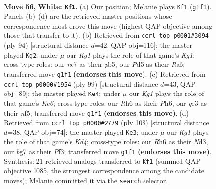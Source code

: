 \documentclass[11pt]{article}
\begin{document}
\clearpage

\begin{figure}[p]\centering
\begin{subfigure}{0.46\textwidth}\centering
\resizebox{\linewidth}{!}{%
\newchessgame
\chessboard[
  setfen={6k1/2n2pb1/7R/3P4/8/4q3/6R1/6K1 w - - 1 56},
  showmover=false,
  pgfstyle=straightmove, color=movearrow, markmove={g1-f1}
]}
\caption{}
\end{subfigure}\hfill
\begin{subfigure}{0.46\textwidth}\centering
\resizebox{\linewidth}{!}{%
\newchessgame
\chessboard[
  setfen={8/3R1pk1/R3P1p1/1p6/8/4q3/8/6K1 w - - 2 48},
  showmover=false,
  pgfstyle=straightmove, color=movearrow, markmove={g1-g2}
]}
\caption{}
\end{subfigure}
\\[4pt]
\begin{subfigure}{0.46\textwidth}\centering
\resizebox{\linewidth}{!}{%
\newchessgame
\chessboard[
  setfen={8/8/7p/5N2/5p2/4k3/6PP/r3BK2 b - - 4 50},
  showmover=false,
  pgfstyle=straightmove, color=movearrow, markmove={e3-e4}
]}
\caption{}
\end{subfigure}\hfill
\begin{subfigure}{0.46\textwidth}\centering
\resizebox{\linewidth}{!}{%
\newchessgame
\chessboard[
  setfen={8/8/5qpk/p2R4/3K4/1P1N1P1B/8/8 w - - 1 55},
  showmover=false,
  pgfstyle=straightmove, color=movearrow, markmove={d4-e3}
]}
\caption{}
\end{subfigure}
\caption{\textbf{Move 56, White: \texttt{Kf1}.} (a) Our position; Melanie plays \texttt{Kf1} (\texttt{g1f1}). Panels (b)--(d) are the retrieved master positions whose correspondence most drove this move (highest QAP objective among those that transfer to it). (b) Retrieved from \texttt{ccrl\_top\_p0001\#3094} (ply 94) [structural distance $d$=42, QAP obj=116]: the master played \texttt{Kg2}; under $\mu$ our \emph{Kg1} plays the role of that game's \emph{Kg1}; cross-type roles: our \emph{n}c7 as their \emph{p}b5, our \emph{P}d5 as their \emph{R}a6; transferred move \texttt{g1f1} \textbf{(endorses this move)}. (c) Retrieved from \texttt{ccrl\_top\_p0000\#1954} (ply 99) [structural distance $d$=43, QAP obj=89]: the master played \texttt{Ke4}; under $\mu$ our \emph{Kg1} plays the role of that game's \emph{Ke6}; cross-type roles: our \emph{R}h6 as their \emph{P}h6, our \emph{q}e3 as their \emph{n}f5; transferred move \texttt{g1f1} \textbf{(endorses this move)}. (d) Retrieved from \texttt{ccrl\_top\_p0000\#2779} (ply 108) [structural distance $d$=38, QAP obj=74]: the master played \texttt{Ke3}; under $\mu$ our \emph{Kg1} plays the role of that game's \emph{Kd4}; cross-type roles: our \emph{R}h6 as their \emph{N}d3, our \emph{b}g7 as their \emph{P}f3; transferred move \texttt{g1f1} \textbf{(endorses this move)}. Synthesis: 21 retrieved analogs transferred to \texttt{Kf1} (summed QAP objective 1085, the strongest correspondence among the candidate moves); Melanie committed it via the \texttt{search} selector.}
\label{fig:thought-m110}
\end{figure}
\end{document}
